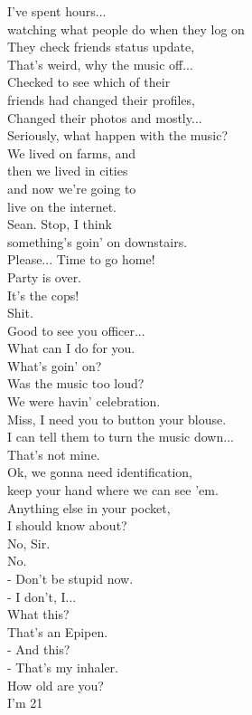 \documentclass{article}
\begin{document}
\begin{multicols}{3}
I've spent hours...\\
watching what people do when they log on\\
They check friends status update,\\
That's weird, why the music off...\\
Checked to see which of their\\
friends had changed their profiles,\\
Changed their photos and mostly...\\
Seriously, what happen with the music?\\
We lived on farms, and\\
then we lived in cities\\
and now we're going to\\
live on the internet.\\
Sean. Stop, I think\\
something's goin' on downstairs.\\
Please... Time to go home!\\
Party is over.\\
It's the cops!\\
Shit.\\
Good to see you officer...\\
What can I do for you.\\
What's goin' on?\\
Was the music too loud?\\
We were havin' celebration.\\
Miss, I need you to button your blouse.\\
I can tell them to turn the music down...\\
That's not mine.\\
Ok, we gonna need identification,\\
keep your hand where we can see 'em.\\
Anything else in your pocket,\\
I should know about?\\
No, Sir.\\
No.\\
- Don't be stupid now.\\
- I don't, I...\\
What this?\\
That's an Epipen.\\
- And this?\\
- That's my inhaler.\\
How old are you?\\
I'm 21\\

\end{multicols}
\end{document}
